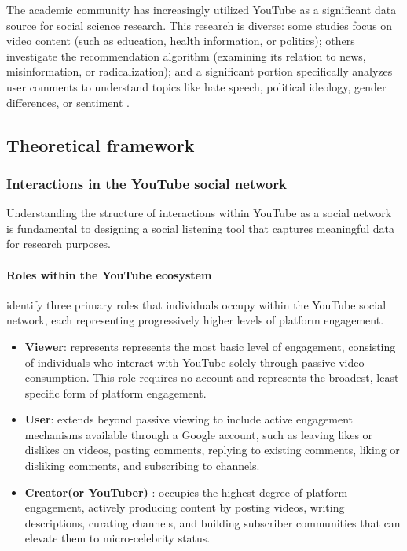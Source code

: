 The academic community has increasingly utilized YouTube as a significant data source for social science research. This research is diverse: some studies focus on video content (such as education, health information, or politics); others investigate the recommendation algorithm (examining its relation to news, misinformation, or radicalization); and a significant portion specifically analyzes user comments to understand topics like hate speech, political ideology, gender differences, or sentiment \parencite{deubel2024overview}.

\subsection{Theoretical framework}

\subsubsection{Interactions in the YouTube social network}

Understanding the structure of interactions within YouTube as a social network is fundamental to designing a social listening tool that captures meaningful data for research purposes.

\paragraph{Roles within the YouTube ecosystem}

\textcite{sui2022youtube} identify three primary roles that individuals occupy within the YouTube social network, each representing progressively higher levels of platform engagement.

\begin{itemize}
	\item \textbf{Viewer}: represents represents the most basic level of engagement, consisting of individuals who interact with YouTube solely through passive video consumption. This role requires no account and represents the broadest, least specific form of platform engagement.

	\item \textbf{User}: extends beyond passive viewing to include active engagement mechanisms available through a Google account, such as leaving likes or dislikes on videos, posting comments, replying to existing comments, liking or disliking comments, and subscribing to channels.

	\item \textbf{Creator(or YouTuber)} : occupies the highest degree of platform engagement, actively producing content by posting videos, writing descriptions, curating channels, and building subscriber communities that can elevate them to micro-celebrity status.
\end{itemize}

